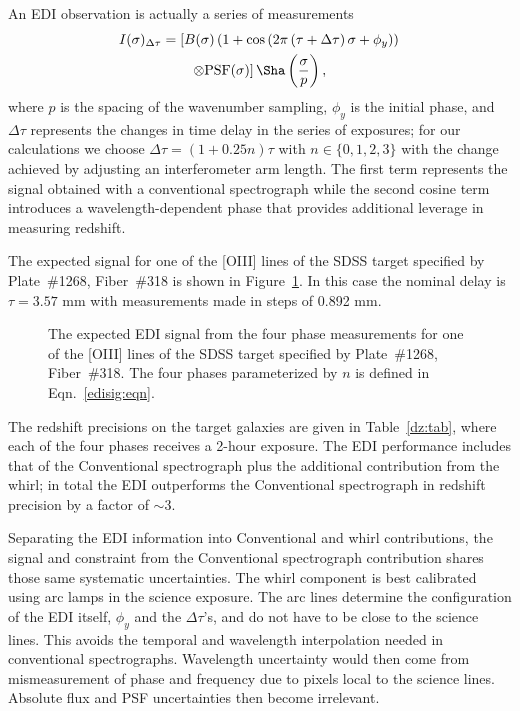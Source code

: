 \documentclass[preprint2, 10pt]{aastex}
\begin{document}
An EDI observation is actually a series of measurements
\begin{align}
I(\sigma)_{\Delta\tau} &= \left[B(\sigma)\left(1+\cos{\left(2\pi\left(\tau+\Delta \tau\right)\sigma+\phi_y \right)} \right) \right. \nonumber\\
&\qquad \left. \otimes \mbox{PSF}(\sigma)\right]\Sha\left(\frac{\sigma}{p}\right),
\label{edisig:eqn}
\end{align}
where $p$ is the spacing of the wavenumber sampling, $\phi_y$ is the initial phase,
and $\Delta \tau$ represents the changes in time delay in the series of exposures; for our calculations we choose  $\Delta \tau = (1+0.25n)\tau $ with $n\in\{0,1,2,3\}$
with the change achieved by adjusting an interferometer arm length.
The first term represents the signal obtained with a conventional spectrograph while the second cosine term
introduces a wavelength-dependent phase that provides additional leverage in measuring redshift.


The expected signal for one of the [OIII] lines of the SDSS target specified by Plate~\#1268, Fiber~\#318 is shown
in Figure~\ref{edicounts:fig}.   In this case the nominal delay is $\tau = 3.57$ mm with measurements
made in steps of 0.892 mm.


\begin{figure}[t]
   \centering
   \caption{The expected EDI signal from the four phase measurements for one of the [OIII] lines of
   the SDSS target specified by Plate~\#1268, Fiber~\#318.
   The four phases parameterized by $n$ is defined in Eqn.~\ref{edisig:eqn}.\label{edicounts:fig}}
\end{figure}


The redshift precisions on the target galaxies are given in Table~\ref{dz:tab}, where each of the four phases receives
a 2-hour exposure.  The EDI performance includes that of the Conventional spectrograph plus
the additional contribution from the whirl; in total the EDI outperforms the Conventional spectrograph
in redshift precision by a factor of $\sim 3$.

Separating the EDI information into Conventional and whirl contributions,
the signal and constraint from the Conventional spectrograph contribution shares those same systematic uncertainties.
The whirl component is best calibrated using arc lamps in the science exposure.  The arc lines determine the configuration
of the EDI itself, $\phi_y$ and the $\Delta \tau$'s, and do not have to be close
to the science lines.  This avoids the temporal and wavelength interpolation needed in conventional spectrographs.
Wavelength uncertainty would then come from mismeasurement of phase and frequency due to pixels local to the
science lines. Absolute flux and PSF uncertainties then become irrelevant.
\end{document}
